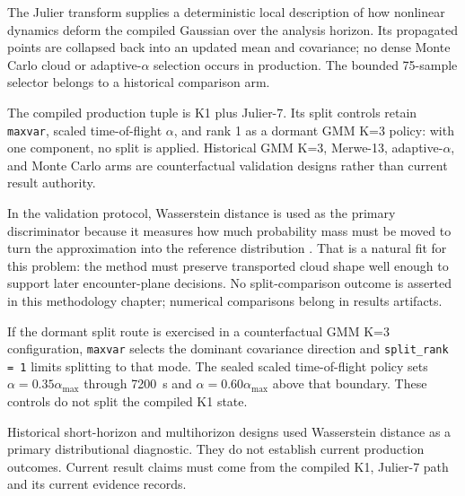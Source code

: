     The Julier transform supplies a deterministic local description of how nonlinear dynamics deform the compiled Gaussian over the analysis horizon. Its propagated points are collapsed back into an updated mean and covariance; no dense Monte Carlo cloud or adaptive-\(\alpha\) selection occurs in production. The bounded \num{75}-sample selector belongs to a historical comparison arm.

    The compiled production tuple is K1 plus Julier-7. Its split controls retain \texttt{maxvar}, scaled time-of-flight \(\alpha\), and rank 1 as a dormant GMM K=3 policy: with one component, no split is applied. Historical GMM K=3, Merwe-13, adaptive-\(\alpha\), and Monte Carlo arms are counterfactual validation designs rather than current result authority.

    In the validation protocol, Wasserstein distance is used as the primary discriminator because it measures how much probability mass must be moved to turn the approximation into the reference distribution \cite{Villani2009,EsfahaniKuhn2018}. That is a natural fit for this problem: the method must preserve transported cloud shape well enough to support later encounter-plane decisions. No split-comparison outcome is asserted in this methodology chapter; numerical comparisons belong in results artifacts.

    If the dormant split route is exercised in a counterfactual GMM K=3 configuration, \texttt{maxvar} selects the dominant covariance direction and \texttt{split\_rank = 1} limits splitting to that mode. The sealed scaled time-of-flight policy sets \(\alpha=0.35\alpha_{\max}\) through \SI{7200}{\second} and \(\alpha=0.60\alpha_{\max}\) above that boundary. These controls do not split the compiled K1 state.

    Historical short-horizon and multihorizon designs used Wasserstein distance as a primary distributional diagnostic. They do not establish current production outcomes. Current result claims must come from the compiled K1, Julier-7 path and its current evidence records.

